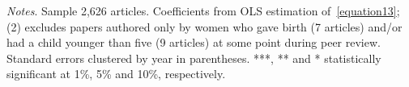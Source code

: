 \begin{table}
\begin{adjustwidth}{-0.085cm}{}
\begin{threeparttable}
\begin{tabular}{p{2.64cm}SSSSSSS}
            \bottomrule
        \end{tabular}
        \begin{tablenotes}
            \tiny
            \item \textit{Notes}. Sample 2,626 articles. Coefficients from OLS estimation of~\autoref{equation13}; (2) excludes papers authored only by women who gave birth (7 articles) and/or had a child younger than five (9 articles) at some point during peer review. Standard errors clustered by year in parentheses. ***, ** and * statistically significant at 1\%, 5\% and 10\%, respectively.
        \end{tablenotes}
    \end{threeparttable}
    \end{adjustwidth}
\end{table}